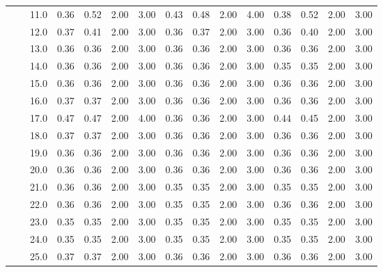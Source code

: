 \begin{tabular}{lllrrrrrrrrrrrr}
      &     & 11.0 &       0.36 &      0.52 & 2.00 &   3.00 &       0.43 &      0.48 & 2.00 &   4.00 &       0.38 &      0.52 & 2.00 &   3.00 \\
      &     & 12.0 &       0.37 &      0.41 & 2.00 &   3.00 &       0.36 &      0.37 & 2.00 &   3.00 &       0.36 &      0.40 & 2.00 &   3.00 \\
      &     & 13.0 &       0.36 &      0.36 & 2.00 &   3.00 &       0.36 &      0.36 & 2.00 &   3.00 &       0.36 &      0.36 & 2.00 &   3.00 \\
      &     & 14.0 &       0.36 &      0.36 & 2.00 &   3.00 &       0.36 &      0.36 & 2.00 &   3.00 &       0.35 &      0.35 & 2.00 &   3.00 \\
      &     & 15.0 &       0.36 &      0.36 & 2.00 &   3.00 &       0.36 &      0.36 & 2.00 &   3.00 &       0.36 &      0.36 & 2.00 &   3.00 \\
      &     & 16.0 &       0.37 &      0.37 & 2.00 &   3.00 &       0.36 &      0.36 & 2.00 &   3.00 &       0.36 &      0.36 & 2.00 &   3.00 \\
      &     & 17.0 &       0.47 &      0.47 & 2.00 &   4.00 &       0.36 &      0.36 & 2.00 &   3.00 &       0.44 &      0.45 & 2.00 &   3.00 \\
      &     & 18.0 &       0.37 &      0.37 & 2.00 &   3.00 &       0.36 &      0.36 & 2.00 &   3.00 &       0.36 &      0.36 & 2.00 &   3.00 \\
      &     & 19.0 &       0.36 &      0.36 & 2.00 &   3.00 &       0.36 &      0.36 & 2.00 &   3.00 &       0.36 &      0.36 & 2.00 &   3.00 \\
      &     & 20.0 &       0.36 &      0.36 & 2.00 &   3.00 &       0.36 &      0.36 & 2.00 &   3.00 &       0.36 &      0.36 & 2.00 &   3.00 \\
      &     & 21.0 &       0.36 &      0.36 & 2.00 &   3.00 &       0.35 &      0.35 & 2.00 &   3.00 &       0.35 &      0.35 & 2.00 &   3.00 \\
      &     & 22.0 &       0.36 &      0.36 & 2.00 &   3.00 &       0.35 &      0.35 & 2.00 &   3.00 &       0.36 &      0.36 & 2.00 &   3.00 \\
      &     & 23.0 &       0.35 &      0.35 & 2.00 &   3.00 &       0.35 &      0.35 & 2.00 &   3.00 &       0.35 &      0.35 & 2.00 &   3.00 \\
      &     & 24.0 &       0.35 &      0.35 & 2.00 &   3.00 &       0.35 &      0.35 & 2.00 &   3.00 &       0.35 &      0.35 & 2.00 &   3.00 \\
      &     & 25.0 &       0.37 &      0.37 & 2.00 &   3.00 &       0.36 &      0.36 & 2.00 &   3.00 &       0.36 &      0.36 & 2.00 &   3.00 \\

\end{tabular}

